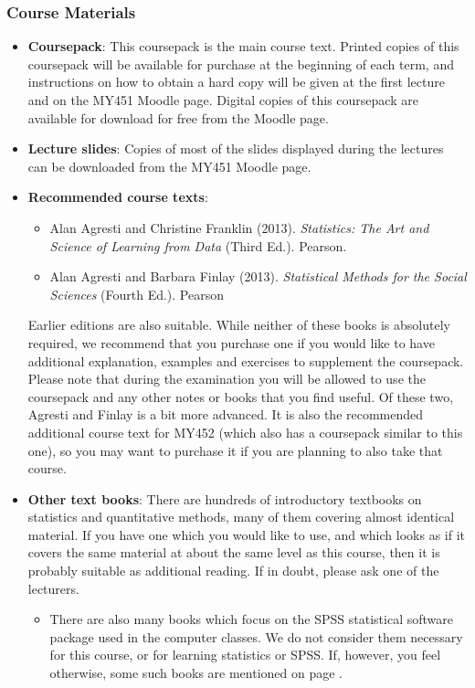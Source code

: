 \subsubsection{Course Materials}
\begin{itemize}
\item
\textbf{Coursepack}:
This coursepack is the main course text.
Printed copies of this coursepack will be available for purchase at the
beginning of each term, and
instructions on how to obtain
a hard copy will be given at the first lecture and on the MY451 Moodle
page.
Digital copies of this coursepack are available
for download for free from the Moodle page.
\item
\textbf{Lecture slides}: Copies of most of the slides displayed during
the lectures can be downloaded from the MY451 Moodle page.
\item
\textbf{Recommended course texts}:
\begin{itemize}
\item
Alan Agresti and Christine Franklin (2013). \emph{Statistics: The Art and
Science of Learning from Data} (Third Ed.). Pearson.
\item
Alan Agresti and Barbara Finlay
(2013). \emph{Statistical Methods for the Social Sciences} (Fourth Ed.).
Pearson
\end{itemize}
Earlier editions are also suitable.
While neither of these books is absolutely required, we
recommend that you purchase one if you would like to have additional
explanation, examples and exercises to supplement the coursepack. Please
note that during the examination you will be allowed to use the
coursepack and any other notes or books that you
find useful. Of these two, Agresti and Finlay is a bit more advanced. It
is also the recommended additional course
text for MY452 (which also has a coursepack similar to this one),
so you may want to purchase it if you are planning to also take
that course.
\item
\textbf{Other text books}: There are hundreds of introductory textbooks
on statistics and quantitative methods, many of them covering almost
identical material. If you have one which you would like to use, and
which looks as if it covers the same material at about the same
level as this course, then it is probably suitable as
additional reading. If in doubt, please ask one of the lecturers.
\begin{itemize}
\item
There are also many books which focus on the SPSS statistical software
package used in the computer classes. We do not consider them necessary
for this course, or for learning statistics or SPSS. If, however, you
feel otherwise, some such books are mentioned on page
\pageref{p_spssbooks}.
\end{itemize}
\end{itemize}

